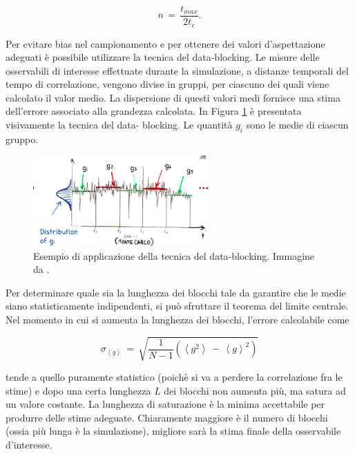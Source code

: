 \begin{equation}
    n\,=\,\frac{t_{max}}{2 t_c}.
    \label{eq: num_ind_samp}
\end{equation}

Per evitare bias nel campionamento e per ottenere dei valori d'aspettazione adeguati è possibile utilizzare la tecnica del 
data-blocking. Le misure delle osservabili di interesse effettuate durante la simulazione, a distanze temporali del tempo di correlazione, 
vengono divise in gruppi, per ciascuno dei quali viene calcolato il valor medio. La dispersione di questi valori medi fornisce una 
stima dell'errore associato alla grandezza calcolata. In Figura \ref{fig: data_block_tech} è presentata visivamente la tecnica del data-
blocking. Le quantità $g_i$ sono le medie di ciascun gruppo.

\begin{figure}[H]
    \centering
    \includegraphics[width=0.6\textwidth]{Immagini/data_blocking.png}
    \caption{Esempio di applicazione della tecnica del data-blocking. Immagine da \cite{galliLSN}.}
    \label{fig: data_block_tech}
\end{figure}

Per determinare quale sia la lunghezza dei blocchi tale da garantire che le medie siano statisticamente indipendenti, si può 
sfruttare il teorema del limite centrale. Nel momento in cui si aumenta la lunghezza dei blocchi, l'errore calcolabile come 

\begin{equation}
    \sigma_{\left<g\right>}\,=\,\sqrt{\frac{1}{N-1}\left(\left<g^2\right>\,-\,\left<g\right>^2\right)}
    \label{eq: error_data_block}
\end{equation}

tende a quello puramente statistico (poichè si va a perdere la correlazione fra le stime) e dopo una certa lunghezza $L$ dei blocchi 
non aumenta più, ma satura ad un valore costante. La lunghezza di saturazione è la minima accettabile per produrre delle stime adeguate. 
Chiaramente maggiore è il numero di blocchi (ossia più lunga è la simulazione), migliore sarà la stima finale della osservabile 
d'interesse.





